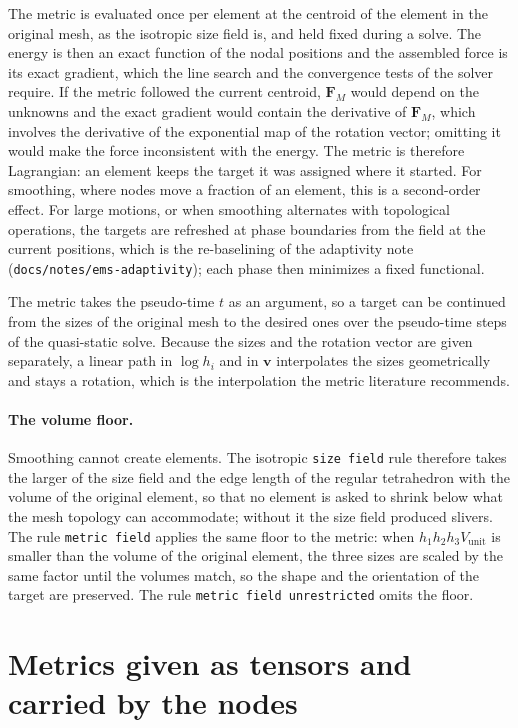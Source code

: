 \documentclass[11pt]{article}
\newcommand{\bs}[1]{\boldsymbol{#1}}
\newcommand{\code}[1]{\texttt{#1}}
\begin{document}
The metric is evaluated once per element at the centroid of the element in
the original mesh, as the isotropic size field is, and held fixed during a
solve. The energy is then an exact function of the nodal positions and the
assembled force is its exact gradient, which the line search and the
convergence tests of the solver require. If the metric followed the
current centroid, $\bs F_M$ would depend on the unknowns and the exact
gradient would contain the derivative of $\bs F_M$, which involves the
derivative of the exponential map of the rotation vector; omitting it
would make the force inconsistent with the energy. The metric is therefore
Lagrangian: an element keeps the target it was assigned where it started.
For smoothing, where nodes move a fraction of an element, this is a
second-order effect. For large motions, or when smoothing alternates with
topological operations, the targets are refreshed at phase boundaries
from the field at the current positions, which is the re-baselining of
the adaptivity note (\code{docs/notes/ems-adaptivity}); each phase then
minimizes a fixed functional.

The metric takes the pseudo-time $t$ as an argument, so a target can be
continued from the sizes of the original mesh to the desired ones over the
pseudo-time steps of the quasi-static solve. Because the sizes and the
rotation vector are given separately, a linear path in $\log h_i$ and in
$\bs v$ interpolates the sizes geometrically and stays a rotation, which is
the interpolation the metric literature recommends.

\paragraph{The volume floor.} Smoothing cannot create elements. The
isotropic \code{size field} rule therefore takes the larger of the size
field and the edge length of the regular tetrahedron with the volume of
the original element, so that no element is asked to shrink below what
the mesh topology can accommodate; without it the size field produced
slivers. The rule \code{metric field} applies the same floor to the
metric: when $h_1 h_2 h_3 V_{\mathrm{unit}}$ is smaller than the volume of
the original element, the three sizes are scaled by the same factor until
the volumes match, so the shape and the orientation of the target are
preserved. The rule \code{metric field unrestricted} omits the floor.

\section{Metrics given as tensors and carried by the nodes}
\label{sec:sources}
\end{document}
